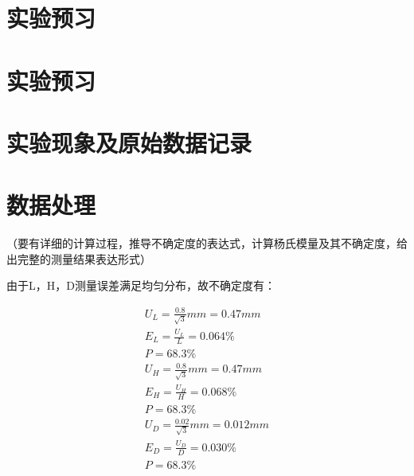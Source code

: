 \documentclass[signature=data]{physicsreport}
\begin{document}
\maketitle

\section{实验预习}
\section{实验预习}

\makeatletter
{}
\makeatother

\newpage

\section{实验现象及原始数据记录}


\makeatletter
{}
\makeatother

\newpage
\section{数据处理}
（要有详细的计算过程，推导不确定度的表达式，计算杨氏模量及其不确定度，给出完整的测量结果表达形式）

由于L，H，D测量误差满足均匀分布，故不确定度有：

\begin{gather*}
    U_L = \frac{0.8}{\sqrt 3}mm = 0.47mm\\
    E_L = \frac{U_L}{L} = 0.064\%\\
    P = 68.3\%\\
    U_H = \frac{0.8}{\sqrt 3}mm = 0.47mm\\
    E_H = \frac{U_H}{H} = 0.068\%\\
    P = 68.3\%\\
    U_D = \frac{0.02}{\sqrt 3}mm = 0.012mm\\
    E_D = \frac{U_D}{D} = 0.030\%\\
    P = 68.3\%\\
\end{gather*}
\end{document}

